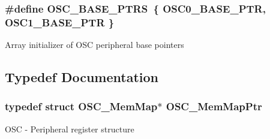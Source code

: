 \subsubsection[{O\+S\+C\+\_\+\+B\+A\+S\+E\+\_\+\+P\+T\+R\+S}]{\setlength{\rightskip}{0pt plus 5cm}\#define O\+S\+C\+\_\+\+B\+A\+S\+E\+\_\+\+P\+T\+R\+S~\{ {\bf O\+S\+C0\+\_\+\+B\+A\+S\+E\+\_\+\+P\+T\+R}, {\bf O\+S\+C1\+\_\+\+B\+A\+S\+E\+\_\+\+P\+T\+R} \}}\label{group___o_s_c___peripheral_ga46f69fcb9d660e18b5cbf51adbbcec78}
Array initializer of O\+S\+C peripheral base pointers 

\subsection{Typedef Documentation}
\hypertarget{group___o_s_c___peripheral_gaaa685163f549fdf24c28ec9b400310b5}{}
\subsubsection[{O\+S\+C\+\_\+\+Mem\+Map\+Ptr}]{\setlength{\rightskip}{0pt plus 5cm}typedef struct {\bf O\+S\+C\+\_\+\+Mem\+Map}$\ast$ {\bf O\+S\+C\+\_\+\+Mem\+Map\+Ptr}}\label{group___o_s_c___peripheral_gaaa685163f549fdf24c28ec9b400310b5}
O\+S\+C -\/ Peripheral register structure 